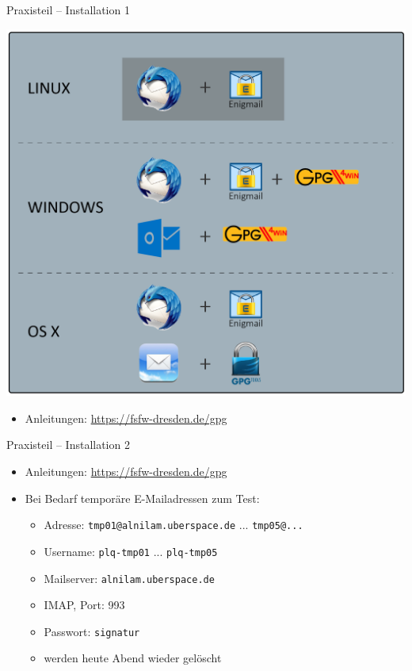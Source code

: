 \documentclass{beamer}
\begin{document}

\begin{frame}{Praxisteil – Installation 1}

  \begin{center}
  \includegraphics[width=.6\textwidth]{img-src/pgp_software.png}
  \end{center}

  \begin{itemize}
    \item Anleitungen: \url{https://fsfw-dresden.de/gpg}
  \end{itemize}

\end{frame}


\begin{frame}{Praxisteil – Installation 2}
  \begin{itemize}
  \item Anleitungen: \url{https://fsfw-dresden.de/gpg}
  \bigskip
  \item Bei Bedarf temporäre E-Mailadressen zum Test:
  \begin{itemize}
    \item Adresse: \texttt{tmp01@alnilam.uberspace.de} ... \texttt{tmp05@...}
    \item Username: \texttt{plq-tmp01} ... \texttt{plq-tmp05}
    \item Mailserver: \texttt{alnilam.uberspace.de}
    \item IMAP, Port: 993
    \item Passwort: \texttt{signatur}
    \bigskip
    \item werden heute Abend wieder gelöscht
  \end{itemize}
  \end{itemize}
\end{frame}
\end{document}
